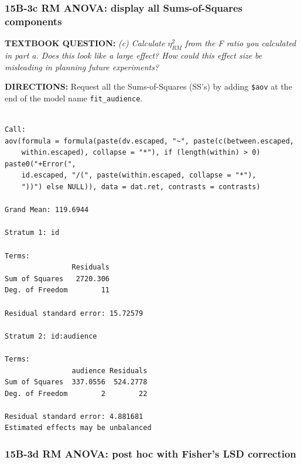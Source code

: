 \documentclass[]{article}
\newenvironment{Shaded}{\begin{snugshade}}{\end{snugshade}}
\newcommand{\CommentTok}[1]{\textcolor[rgb]{0.56,0.35,0.01}{\textit{#1}}}
\newcommand{\OperatorTok}[1]{\textcolor[rgb]{0.81,0.36,0.00}{\textbf{#1}}}
\newcommand{\NormalTok}[1]{#1}
\begin{document}
\clearpage

\subsubsection{15B-3c RM ANOVA: display all Sums-of-Squares
components}\label{b-3c-rm-anova-display-all-sums-of-squares-components}

\textbf{TEXTBOOK QUESTION:} \emph{(c) Calculate \(\eta_{RM}^2\) from the
F ratio you calculated in part a. Does this look like a large effect?
How could this effect size be misleading in planning future
experiments?}

\textbf{DIRECTIONS:} Request all the Sums-of-Squares (SS's) by adding
\texttt{\$aov} at the end of the model name \texttt{fit\_audience}.

\begin{Shaded}
\end{Shaded}

\begin{verbatim}

Call:
aov(formula = formula(paste(dv.escaped, "~", paste(c(between.escaped, 
    within.escaped), collapse = "*"), if (length(within) > 0) paste0("+Error(", 
    id.escaped, "/(", paste(within.escaped, collapse = "*"), 
    "))") else NULL)), data = dat.ret, contrasts = contrasts)

Grand Mean: 119.6944

Stratum 1: id

Terms:
                Residuals
Sum of Squares   2720.306
Deg. of Freedom        11

Residual standard error: 15.72579

Stratum 2: id:audience

Terms:
                audience Residuals
Sum of Squares  337.0556  524.2778
Deg. of Freedom        2        22

Residual standard error: 4.881681
Estimated effects may be unbalanced
\end{verbatim}

\clearpage

\subsubsection{15B-3d RM ANOVA: post hoc with Fisher's LSD
correction}\label{b-3d-rm-anova-post-hoc-with-fishers-lsd-correction}
\end{document}
